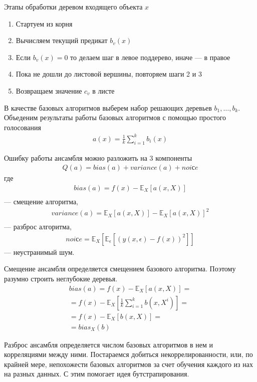Этапы обработки деревом входящего объекта $x$
\begin{enumerate}
	\item Стартуем из корня
	\item Вычисляем текущий предикат $b_v(x)$
	\item Если $b_v(x) = 0$ то делаем шаг в левое поддерево, иначе --- в правое
	\item Пока не дошли до листовой вершины, повторяем шаги 2 и 3
	\item Возвращаем значение $c_v$ в листе
\end{enumerate}

В качестве базовых алгоритмов выберем набор решающих деревьев $b_1, \dots, b_k$.
Объеденим результаты работы базовых алгоритмов с помощью простого голосования
\begin{align}
	a(x) = \frac{1}{k} \sum_{i=1}^{k} b_i(x)
\end{align}

Ошибку работы ансамбля можно разложить на 3 компоненты
\begin{align}
	Q(a) = bias(a) + variance(a) + noiсe
\end{align}
где
\begin{align}
	bias(a) = f(x) - \mathbb{E}_X\left[a(x, X)\right] \\
\end{align} 
--- смещение алгоритма,
\begin{align}
	variance(a) = \mathbb{E}_X\left[a(x, X)\right] -\mathbb{E}_X\left[a(x, X)\right]^2 \\
\end{align}
--- разброс алгоритма,
\begin{align}
	noiсe = \mathbb{E}_X\left[\mathbb{E}_{\epsilon}\left[\left( y(x, \epsilon) - f(x) \right)^2\right]\right]
\end{align}
--- неустранимый шум.

Смещение ансамбля определяется смещением базового алгоритма. Поэтому разумно строить неглубокие деревья.
\begin{align}
	bias(a) = 
	f(x) - \mathbb{E}_X\left[a(x, X)\right] = \\
	= f(x) - \mathbb{E}_X\left[\frac{1}{k} \sum_{i=1}^{k} b(x, X^i)\right] = \\
	= f(x) - \mathbb{E}_X\left[b(x, X)\right] = \\
	= bias_X(b)
\end{align}

Разброс ансамбля определяется числом базовых алгоритмов в нем и корреляциями между ними.
Постараемся добиться некоррелированности, или, по крайней мере, непохожести базовых алгоритмов за счет обучения
каждого из нах на разных данных. С этим помогает идея бутстрапирования.


